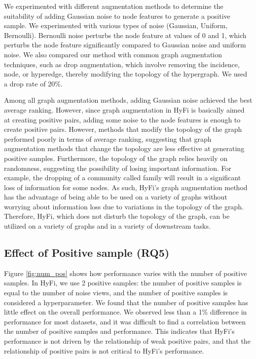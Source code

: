
We experimented with different augmentation methods to determine the suitability of adding Gaussian noise to node features to generate a positive sample. We experimented with various types of noise (Gaussian, Uniform, Bernoulli). Bernoulli noise perturbs the node feature at values of 0 and 1, which perturbs the node feature significantly compared to Gaussian noise and uniform noise. We also compared our method with common graph augmentation techniques, such as drop augmentation, which involve removing the incidence, node, or hyperedge, thereby modifying the topology of the hypergraph. We used a drop rate of 20\%.

Among all graph augmentation methods, adding Gaussian noise achieved the best average ranking. However, since graph augmentation in HyFi is basically aimed at creating positive pairs, adding some noise to the node features is enough to create positive pairs. However, methods that modify the topology of the graph performed poorly in terms of average ranking, suggesting that graph augmentation methods that change the topology are less effective at generating positive samples. Furthermore, the topology of the graph relies heavily on randomness, suggesting the possibility of losing important information. For example, the dropping of a community called family will result in a significant loss of information for some nodes. As such, HyFi's graph augmentation method has the advantage of being able to be used on a variety of graphs without worrying about information loss due to variations in the topology of the graph. Therefore, HyFi, which does not disturb the topology of the graph, can be utilized on a variety of graphs and in a variety of downstream tasks. 


\subsection{Effect of Positive sample (RQ5)}


Figure \ref{fig:num_pos} shows how performance varies with the number of positive samples. In HyFi, we use 2 positive samples: the number of positive samples is equal to the number of noise views, and the number of positive samples is considered a hyperparameter. We found that the number of positive samples has little effect on the overall performance. We observed less than a 1\% difference in performance for most datasets, and it was difficult to find a correlation between the number of positive samples and performance. This indicates that HyFi's performance is not driven by the relationship of weak positive pairs, and that the relationship of positive pairs is not critical to HyFi's performance.
